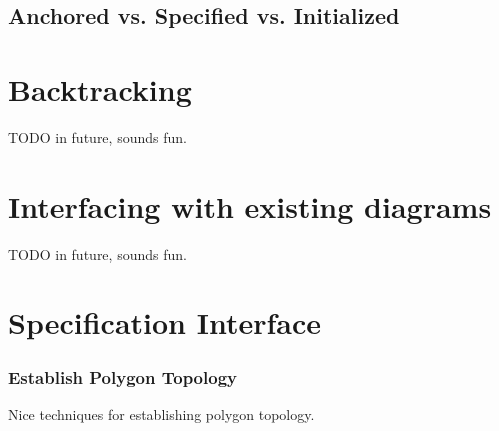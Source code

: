 \subsection{Anchored vs. Specified vs. Initialized}

\section{Backtracking}

TODO in future, sounds fun.

\section{Interfacing with existing diagrams}

TODO in future, sounds fun.

\section{Specification Interface}

\subsubsection{Establish Polygon Topology}

Nice techniques for establishing polygon topology.
